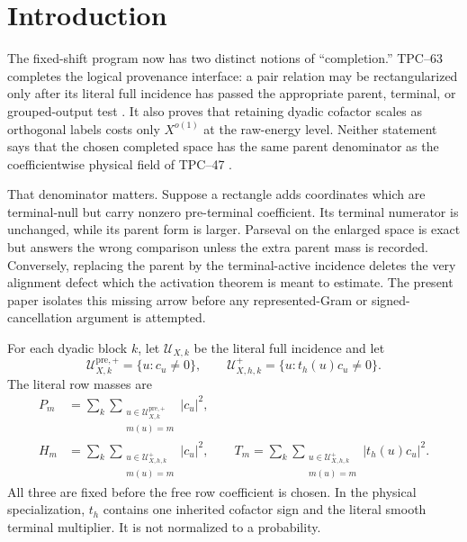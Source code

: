 \section{Introduction}
\label{sec:tpc64-introduction}

The fixed-shift program now has two distinct notions of ``completion.''
TPC--63 completes the logical provenance interface: a pair relation may be
rectangularized only after its literal full incidence has passed the
appropriate parent, terminal, or grouped-output test
\citep{WangTPC63}.  It also proves that retaining dyadic cofactor scales as
orthogonal labels costs only \(X^{o(1)}\) at the raw-energy level.  Neither
statement says that the chosen completed space has the same parent
denominator as the coefficientwise physical field of TPC--47
\citep{WangTPC47}.

That denominator matters.  Suppose a rectangle adds coordinates which are
terminal-null but carry nonzero pre-terminal coefficient.  Its terminal
numerator is unchanged, while its parent form is larger.  Parseval on the
enlarged space is exact but answers the wrong comparison unless the extra
parent mass is recorded.  Conversely, replacing the parent by the
terminal-active incidence deletes the very alignment defect which the
activation theorem is meant to estimate.  The present paper isolates this
missing arrow before any represented-Gram or signed-cancellation argument is
attempted.

For each dyadic block \(k\), let \(\mathcal U_{X,k}\) be the literal full
incidence and let
\[
 \mathcal U_{X,k}^{\mathrm{pre},+}
 =\{u:c_u\ne0\},
 \qquad
 \mathcal U_{X,h,k}^{+}
 =\{u:t_h(u)c_u\ne0\}.
\]
The literal row masses are
\begin{align}
 P_m&=\sum_{k}\sum_{\substack{u\in
       \mathcal U_{X,k}^{\mathrm{pre},+}\\m(u)=m}}|c_u|^2,
 \label{eq:tpc64-intro-parent-mass}\\
 H_m&=\sum_{k}\sum_{\substack{u\in
       \mathcal U_{X,h,k}^{+}\\m(u)=m}}|c_u|^2,
 \qquad
 T_m=\sum_{k}\sum_{\substack{u\in
       \mathcal U_{X,h,k}^{+}\\m(u)=m}}|t_h(u)c_u|^2.
 \label{eq:tpc64-intro-terminal-masses}
\end{align}
All three are fixed before the free row coefficient is chosen.  In the
physical specialization, \(t_h\) contains one inherited cofactor sign and
the literal smooth terminal multiplier.  It is not normalized to a
probability.

